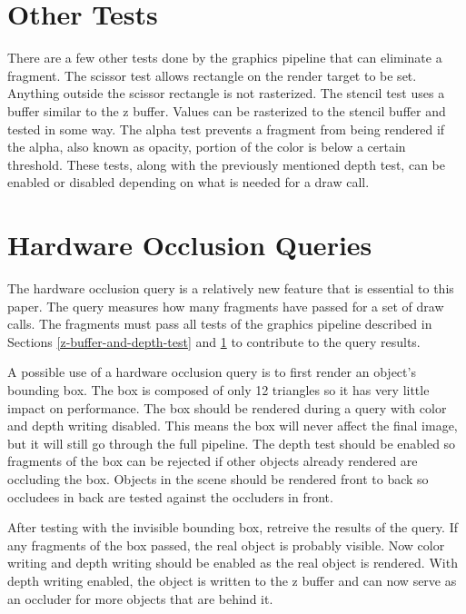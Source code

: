 \documentclass[12pt]{ucthesis}
\begin{document}
\section{Other Tests}
\label{other-tests}

There are a few other tests done by the graphics pipeline that can eliminate a fragment.\cite{GpuGem-Occlusion}
The scissor test allows rectangle on the render target to be set.
Anything outside the scissor rectangle is not rasterized.
The stencil test uses a buffer similar to the z buffer.\cite{d3d11-pipeline}
Values can be rasterized to the stencil buffer and tested in some way.
The alpha test prevents a fragment from being rendered if the alpha, also known as opacity, portion of the color is below a certain threshold.
These tests, along with the previously mentioned depth test, can be enabled or disabled depending on what is needed for a draw call.

\section{Hardware Occlusion Queries}
\label{hardware-occlusion-queries}

The hardware occlusion query is a relatively new feature that is essential to this paper.
The query measures how many fragments have passed for a set of draw calls.
The fragments must pass all tests of the graphics pipeline described in Sections \ref{z-buffer-and-depth-test} and \ref{other-tests} to contribute to the query results.

A possible use of a hardware occlusion query is to first render an object's bounding box.
The box is composed of only 12 triangles so it has very little impact on performance.
The box should be rendered during a query with color and depth writing disabled.
This means the box will never affect the final image, but it will still go through the full pipeline.
The depth test should be enabled so fragments of the box can be rejected if other objects already rendered are occluding the box.
Objects in the scene should be rendered front to back so occludees in back are tested against the occluders in front.

After testing with the invisible bounding box, retreive the results of the query.
If any fragments of the box passed, the real object is probably visible.
Now color writing and depth writing should be enabled as the real object is rendered.
With depth writing enabled, the object is written to the z buffer and can now serve as an occluder for more objects that are behind it.
\end{document}
